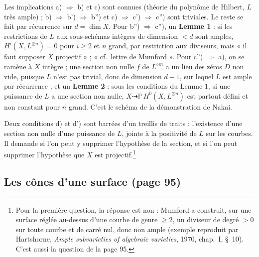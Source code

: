 \documentclass[11pt,a4paper]{article}
\begin{document}
Les implications a) $\Rightarrow$ b) et c) sont connues (théorie du polynôme de
Hilbert, $L$ très ample) ; b) $\Rightarrow$ b') $\Rightarrow$ b'') et c)
$\Rightarrow$ c') $\Rightarrow$ c'') sont triviales. Le reste se fait par
récurrence sur $d = \dim X$. Pour b'') $\Rightarrow$ c''), un \textbf{Lemme 1} :
si les restrictions de $L$ aux sous-schémas intègres de dimension $< d$ sont
amples, $H^{i}(X, L^{\otimes n}) = 0$ pour $i \geqslant 2$ et $n$ grand, par
restriction aux diviseurs, mais « il faut supposer $X$ projectif » ;
« cf.\ lettre de Mumford ». Pour c'') $\Rightarrow$ a), on se ramène à $X$
intègre ; une section non nulle $f$ de $L^{\otimes n}$ a un lieu des zéros $D$
non vide, puisque $L$ n'est pas trivial, donc de dimension $d - 1$, sur lequel
$L$ est ample par récurrence ; et un \textbf{Lemme 2} : sous les conditions du
Lemme 1, si une puissance de $L$ a une section non nulle, $X \dashrightarrow
\mathbb{P}\,H^{0}(X, L^{\otimes n})$ est partout défini et non constant pour $n$
grand. C'est le schéma de la démonstration de Nakai.

Deux conditions d) et d') sont barrées d'un treillis de traits : l'existence
d'une section non nulle d'une puissance de $L$, jointe à la positivité de $L$
sur les courbes. Il demande si l'on peut y supprimer l'hypothèse de la section,
et si l'on peut supprimer l'hypothèse que $X$ est projectif.\footnote{Pour la
première question, la réponse est non : Mumford a construit, sur une surface
réglée au-dessus d'une courbe de genre $\geqslant 2$, un diviseur de degré $> 0$
sur toute courbe et de carré nul, donc non ample (exemple reproduit par
Hartshorne, \emph{Ample subvarieties of algebraic varieties}, 1970, chap.\ I,
§~10). C'est aussi la question de la page 95.}

\subsection*{Les cônes d'une surface (page 95)}
\end{document}
